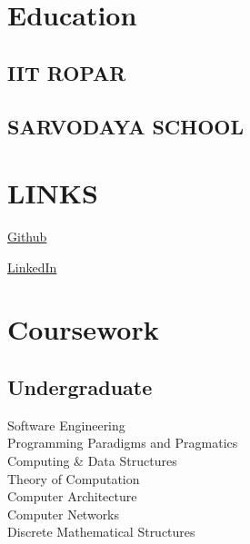 \documentclass[letterpaper]{deedy-resume}
\begin{document}
\begin{minipage}[t]{0.29\textwidth} 

\section{Education} 

\subsection{IIT ROPAR}


\sectionspace 

\subsection{SARVODAYA SCHOOL}
\sectionspace 

\section{LINKS} 

\href{https://github.com/sidowic}{Github}

\href{https://www.linkedin.com/in/siddhartha-nayak-9466441a9/}{LinkedIn}

\sectionspace 

\sectionspace 

\section{Coursework}


\sectionspace 

\subsection{Undergraduate}


Software Engineering \\
Programming Paradigms and Pragmatics \\
Computing & Data Structures \\
Theory of Computation \\
Computer Architecture \\
Computer Networks \\
Discrete Mathematical Structures \\ 




\end{minipage}
\end{document}
